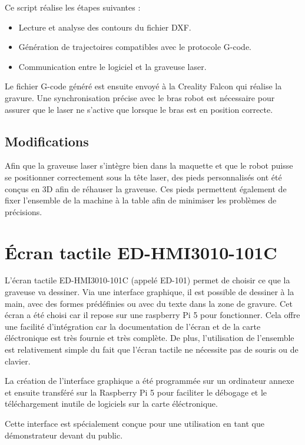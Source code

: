 Ce script réalise les étapes suivantes :
\begin{itemize}
    \item Lecture et analyse des contours du fichier DXF.
    \item Génération de trajectoires compatibles avec le protocole G-code.
    \item Communication entre le logiciel et la graveuse laser.
\end{itemize}

Le fichier G-code généré est ensuite envoyé à la Creality Falcon qui réalise la gravure. Une synchronisation précise avec le bras robot est nécessaire pour assurer que le laser ne s'active que lorsque le bras est en position correcte.

\subsection{Modifications}

Afin que la graveuse laser s'intègre bien dans la maquette et que le robot puisse se positionner correctement sous la tête laser, des pieds personnalisés ont été conçus en 3D afin de réhauser la graveuse. Ces pieds permettent également de fixer l'ensemble de la machine à la table afin de minimiser les problèmes de précisions.

\section{Écran tactile ED-HMI3010-101C}

L’écran tactile ED-HMI3010-101C (appelé ED-101) permet de choisir ce que la graveuse va dessiner. Via une interface graphique, il est possible de dessiner à la main, avec des formes prédéfinies ou avec du texte dans la zone de gravure.
Cet écran a été choisi car il repose sur une raspberry Pi 5 pour fonctionner. Cela offre une facilité d'intégration car la documentation de l'écran et de la carte éléctronique est très fournie et très complète. De plus, l'utilisation de l'ensemble est relativement simple du fait que l'écran tactile ne nécessite pas de souris ou de clavier.

La création de l'interface graphique a été programmée sur un ordinateur annexe et ensuite transféré sur la Raspberry Pi 5 pour faciliter le débogage et le téléchargement inutile de logiciels sur la carte éléctronique.

Cette interface est spécialement conçue pour une utilisation en tant que démonstrateur devant du public.

